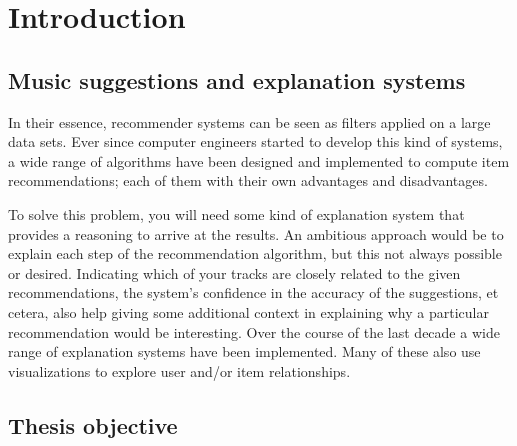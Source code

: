 \chapter{Introduction}\label{chapter:introduction}


\section{Music suggestions and explanation systems}\label{chapter:introduction:section:context}

In their essence, recommender systems can be seen as filters applied on a large data sets. Ever since computer engineers started to develop this kind of systems, a wide range of algorithms have been designed and implemented to compute item recommendations\cite{burke:2002, melville:2002:CCF:777092.777124, pazzani:2007:CRS:1768197.1768209, rajaraman:2012}; each of them with their own advantages and disadvantages.

To solve this problem, you will need some kind of explanation system that provides a reasoning to arrive at the results. An ambitious approach would be to explain each step of the recommendation algorithm, but this not always possible or desired. Indicating which of your tracks are closely related to the given recommendations, the system's confidence in the accuracy of the suggestions, et cetera, also help giving some additional context in explaining why a particular recommendation would be interesting\cite{herlocker:2000}. Over the course of the last decade a wide range of explanation systems have been implemented. Many of these also use visualizations to explore user and/or item relationships\cite{bostandjiev:2012, crnovrsanin:2011:VRN:2421953.2422013, faridani:2010:opinionspace, gou:2011:SIF:2016656.2016671, gretarsson:2010, odonovan:2008}.

\section{Thesis objective}\label{chapter:introduction:section:objective}

